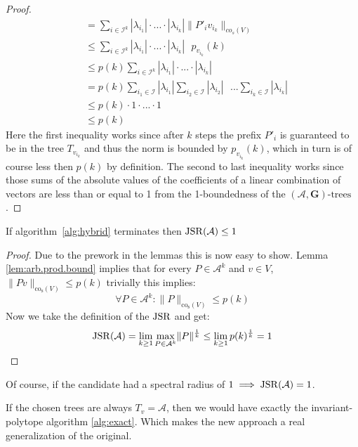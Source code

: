 \begin{proof}
$$\begin{aligned}
  & = \sum \limits_{i \in \mathcal{I}^{k}} |\lambda_{i_1}| \cdot ... \cdot |\lambda_{i_k}| \|P'_{i}v_{i_{k}} \|_{co_s(V)}\\
  & \leq \sum \limits_{i \in \mathcal{I}^{k}} |\lambda_{i_1}| \cdot ... \cdot |\lambda_{i_k}| \text{ } p_{v_{i_k}}(k) \\
  & \leq p(k)\sum \limits_{i \in \mathcal{I}^{k}} |\lambda_{i_1}| \cdot ... \cdot |\lambda_{i_k}| \\
  & =  p(k)\sum \limits_{i_1 \in \mathcal{I}} |\lambda_{i_1}| \sum \limits_{i_2 \in \mathcal{I}} |\lambda_{i_2}| \text{ } ... \sum \limits_{i_k \in \mathcal{I}} |\lambda_{i_k}| \\
  & \leq p(k) \cdot 1 \cdot ... \cdot 1\\
  & \leq p(k)
\end{aligned}
$$
Here the first inequality works since after $k$ steps the prefix $P'_{i}$ is guaranteed to be in the tree $T_{v_{i_k}}$ and thus the norm is bounded by $p_{v_{i_k}}(k)$, which in turn is of course less then $p(k)$ by definition. The second to last inequality works since those sums of the absolute values of the coefficients of a linear combination of vectors are less than or equal to 1 from the 1-boundedness of the $(\mathcal{A},\mathbf{G})\text{-trees}$.
\end{proof}

\begin{theorem}{}\label{thm:hybrid-found}
If algorithm~\ref{alg:hybrid} terminates then $\operatorname{JSR}(\mathcal{A}) \leq 1$
\end{theorem}

\begin{proof}
  Due to the prework in the lemmas this is now easy to show. 
  Lemma \ref{lem:arb.prod.bound} implies that for every $P \in \mathcal{A}^k$ and $v \in V$, $\lVert Pv \rVert _{\text{co}_{\text{s}}(V)} \le p(k)$
  trivially this implies: 
  $$
    \forall P \in \mathcal{A}^k: \lVert P \rVert _{\text{co}_{\text{s}}(V)} \le p(k)
  $$
  Now we take the definition of the $\operatorname{JSR}$ and get:
  $$
    \operatorname{JSR}(\mathcal{A}) = \lim_{k \geq 1} \max_{P \in \mathcal{A}^k} \lVert P \rVert^\frac{1}{k} \le \lim_{k \geq 1} p(k)^\frac{1}{k} = 1
  $$ 
\end{proof}

Of course, if the candidate had a spectral radius of $1 \implies \operatorname{JSR}(\mathcal{A}) = 1$.

\begin{corollary}
  If the chosen trees are always $T_v = \mathcal{A}$, then we would have exactly the invariant-polytope algorithm \ref{alg:exact}. 
  Which makes the new approach a real generalization of the original. \\
\end{corollary}

